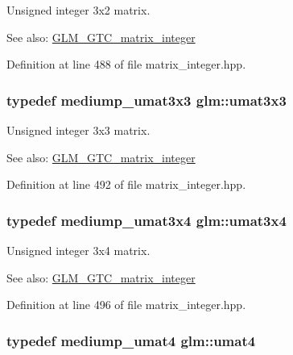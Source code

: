 Unsigned integer 3x2 matrix. \begin{Desc}
\item[See also:]\hyperlink{group__gtc__matrix__integer}{GLM\_\-GTC\_\-matrix\_\-integer} \end{Desc}


Definition at line 488 of file matrix\_\-integer.hpp.\hypertarget{group__gtc__matrix__integer_gb80b6501ba1b2c40119a0f2d256f4c97}{
\subsubsection[umat3x3]{\setlength{\rightskip}{0pt plus 5cm}typedef mediump\_\-umat3x3 {\bf glm::umat3x3}}}
\label{group__gtc__matrix__integer_gb80b6501ba1b2c40119a0f2d256f4c97}


Unsigned integer 3x3 matrix. \begin{Desc}
\item[See also:]\hyperlink{group__gtc__matrix__integer}{GLM\_\-GTC\_\-matrix\_\-integer} \end{Desc}


Definition at line 492 of file matrix\_\-integer.hpp.\hypertarget{group__gtc__matrix__integer_g5410857d098a989a30b4017100bc2ff7}{
\subsubsection[umat3x4]{\setlength{\rightskip}{0pt plus 5cm}typedef mediump\_\-umat3x4 {\bf glm::umat3x4}}}
\label{group__gtc__matrix__integer_g5410857d098a989a30b4017100bc2ff7}


Unsigned integer 3x4 matrix. \begin{Desc}
\item[See also:]\hyperlink{group__gtc__matrix__integer}{GLM\_\-GTC\_\-matrix\_\-integer} \end{Desc}


Definition at line 496 of file matrix\_\-integer.hpp.\hypertarget{group__gtc__matrix__integer_g7ae562000d8a8d193e9f93cf51e2e113}{
\subsubsection[umat4]{\setlength{\rightskip}{0pt plus 5cm}typedef mediump\_\-umat4 {\bf glm::umat4}}}
\label{group__gtc__matrix__integer_g7ae562000d8a8d193e9f93cf51e2e113}


